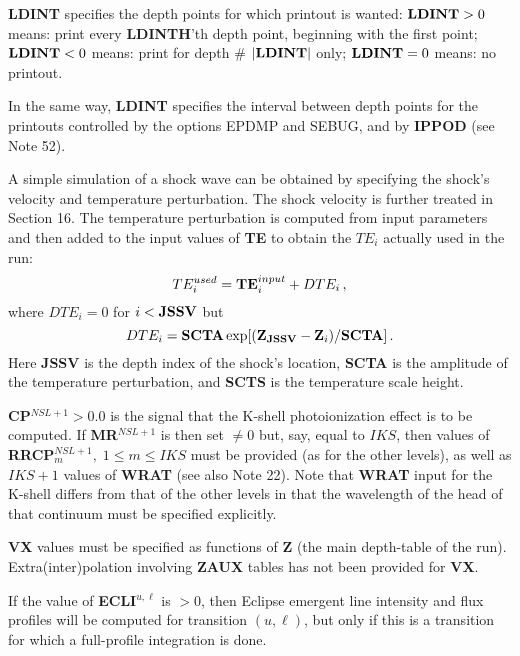 {\bf LDINT}
specifies the depth points for which printout is wanted: \np
${\bf LDINT} > 0$ means: print every {\bf LDINTH}'th depth point, beginning
with the first point;\np
${\bf LDINT} < 0$ means: print for depth \# $\vert {\bf LDINT} \vert$ only; \np
${\bf LDINT} = 0$ means: no printout.

In the same way, {\bf LDINT} specifies the interval between depth points for
the printouts controlled by the options EPDMP and SEBUG, and by {\bf IPPOD}
(see Note 52). 
\blankline
\blankline
\centerline{}
\space \noindent
A simple simulation of a shock wave can be obtained by specifying the shock's
velocity and temperature perturbation. The shock velocity is further treated
in Section 16. The temperature perturbation is computed from input parameters
and then added to the input values of {\bf TE} to obtain the $TE_i$ actually
used in the run:
$$ TE^{used}_i = {\bf TE}^{input}_i + DTE_i \, , $$
where $DTE_i = 0$ for $i < {\bf JSSV}$ but
$$ DTE_i = {\bf SCTA} \exp [({\bf Z}_{\bf JSSV} - {\bf Z}_i) / {\bf SCTA}] \, . $$
Here {\bf JSSV} is the depth index of the shock's location, {\bf SCTA}
is the amplitude of the temperature perturbation, and {\bf SCTS}
is the temperature scale height.
\blankline
\blankline
\centerline{}
\space \noindent
{\bf CP}$^{NSL+1} > 0.0$ is the signal that the K-shell photoionization effect
is to be computed. If {\bf MR}$^{NSL+1}$ is then set $\neq 0$ but, say, equal
to $IKS$, then values of {\bf RRCP}$^{NSL+1}_m, \; 1 \leq m \leq IKS$ must be 
provided (as for the other levels), as well as $IKS+1$ values of {\bf WRAT}
(see also Note 22). Note that 
{\bf WRAT} input for the K-shell differs from that of the
other levels in that the wavelength of the head of that continuum must be
specified explicitly.
\ej
\centerline{}
\space \noindent
{\bf VX} values must be specified as functions of {\bf Z}
(the main depth-table of the run).
Extra(inter)polation involving {\bf ZAUX} tables has not been provided
for {\bf VX}.
\blankline
\blankline
\centerline{}
\space \noindent
If the value of {\bf ECLI}$^{u,\ell}$ is $> 0$, then Eclipse emergent line 
intensity and flux profiles will be computed for transition $(u,\ell)$,
but only if this is a transition for which a full-profile integration
is done.
\blankline
\blankline
\centerline{}
\space \noindent
